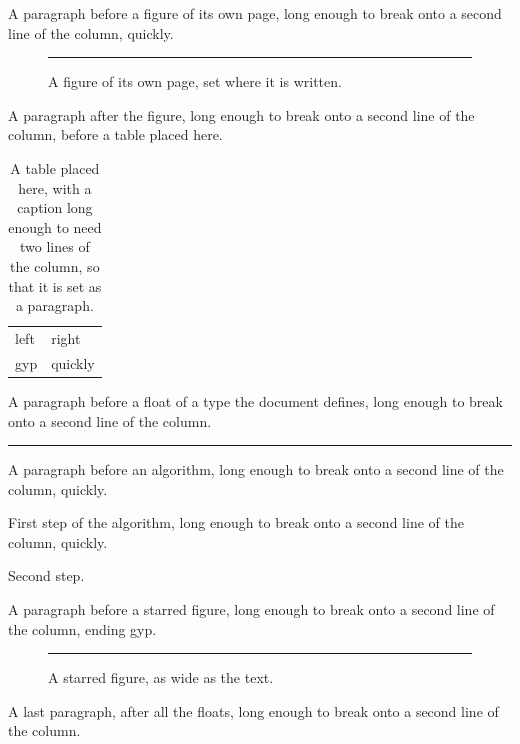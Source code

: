 \documentclass{article}
\begin{document}
A paragraph before a figure of its own page, long enough to break onto a second
line of the column, quickly.
\begin{figure}[p]
  \centering
  \rule{3cm}{1cm}
  \caption{A figure of its own page, set where it is written.}
\end{figure}
A paragraph after the figure, long enough to break onto a second line of the
column, before a table placed here.
\begin{table}[h]
  \centering
  \begin{tabular}{ll}
    left & right \\
    gyp & quickly
  \end{tabular}
  \caption{A table placed here, with a caption long enough to need two lines
    of the column, so that it is set as a paragraph.}
\end{table}
A paragraph before a float of a type the document defines, long enough to
break onto a second line of the column.
\begin{program}
  \centering
  \rule{4cm}{0.5cm}
  \caption{A program, a float of the document's own type.}
\end{program}
A paragraph before an algorithm, long enough to break onto a second line of the
column, quickly.
\begin{algorithm}
  \caption{An algorithm, ruled above and below its caption}
  First step of the algorithm, long enough to break onto a second line of the
  column, quickly.

  Second step.
\end{algorithm}
A paragraph before a starred figure, long enough to break onto a second line of
the column, ending gyp.
\begin{figure}
  \centering
  \rule{5cm}{1cm}
  \caption{A starred figure, as wide as the text.}
\end{figure}
A last paragraph, after all the floats, long enough to break onto a second line
of the column.
\end{document}
